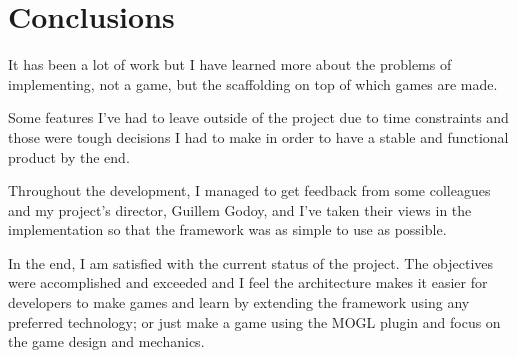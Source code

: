 \chapter{Conclusions}\label{ch:conclusions}

It has been a lot of work but I have learned more about the problems of implementing, 
not a game, but the scaffolding on top of which games are made.

Some features I've had to leave outside of the project due to time constraints and 
those were tough decisions I had to make in order to have a stable and functional product by 
the end.

Throughout the development, I managed to get feedback from some colleagues and my project's 
director, Guillem Godoy, and I've taken their views in the implementation so that 
the framework was as simple to use as possible.

In the end, I am satisfied with the current status of the project. The objectives were 
accomplished and exceeded and I feel the architecture makes it easier for developers 
to make games and learn by extending the framework using any preferred technology;
or just make a game using the MOGL plugin and focus on the game design and mechanics.
